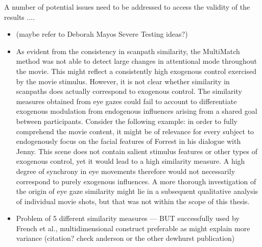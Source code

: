 \documentclass[a4paper, 12pt]{scrreprt}
\begin{document}
 
 \bigskip 
 
 A number of potential issues need to be addressed to access the validity of the results ....
 
 
\begin{itemize}
 	\item (maybe refer to Deborah Mayos Severe Testing ideas?)
 	\item As evident from the consistency in scanpath similarity, the MultiMatch method was not able to detect large changes in attentional mode throughout the movie. This might reflect a consistently high exogenous control exercised by the movie stimulus. However, it is not clear whether similarity in scanpaths does actually correspond to exogenous control. The similarity measures obtained from eye gazes could fail to account to differentiate exogenous modulation from endogenous influences arising from a shared goal between participants. Consider the following example: in order to fully comprehend the movie content, it might be of relevance for every subject to endogenously focus on the facial features of Forrest in his dialogue with Jenny. This scene does not contain salient stimulus features or other types of exogenous control, yet it would lead to a high similarity measure. A high degree of synchrony in eye movements therefore would not necessarily correspond to purely exogenous influences. A more thorough investigation of the origin of eye gaze similarity might lie in a subsequent qualitative analysis of individual movie shots, but that was not within the scope of this thesis.
 	\item Problem of 5 different similarity measures --- BUT successfully used by French et al., multidimensional construct preferable as might explain more variance (citation? check anderson or the other dewhurst publication) 

\end{itemize}
\end{document}
